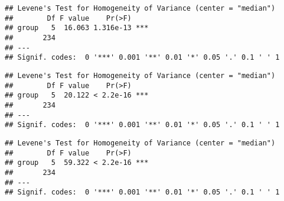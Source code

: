 \documentclass[
]{article}
\newenvironment{Shaded}{\begin{snugshade}}{\end{snugshade}}
\newcommand{\AttributeTok}[1]{\textcolor[rgb]{0.80,0.80,0.80}{#1}}
\newcommand{\FunctionTok}[1]{\textcolor[rgb]{0.94,0.94,0.56}{#1}}
\newcommand{\NormalTok}[1]{\textcolor[rgb]{0.80,0.80,0.80}{#1}}
\newcommand{\SpecialCharTok}[1]{\textcolor[rgb]{0.86,0.64,0.64}{#1}}
\newcommand{\StringTok}[1]{\textcolor[rgb]{0.80,0.58,0.58}{#1}}
\begin{document}
\begin{Shaded}
\end{Shaded}

\begin{verbatim}
## Levene's Test for Homogeneity of Variance (center = "median")
##        Df F value    Pr(>F)    
## group   5  16.063 1.316e-13 ***
##       234                      
## ---
## Signif. codes:  0 '***' 0.001 '**' 0.01 '*' 0.05 '.' 0.1 ' ' 1
\end{verbatim}

\begin{Shaded}
\end{Shaded}

\begin{verbatim}
## Levene's Test for Homogeneity of Variance (center = "median")
##        Df F value    Pr(>F)    
## group   5  20.122 < 2.2e-16 ***
##       234                      
## ---
## Signif. codes:  0 '***' 0.001 '**' 0.01 '*' 0.05 '.' 0.1 ' ' 1
\end{verbatim}

\begin{Shaded}
\end{Shaded}

\begin{verbatim}
## Levene's Test for Homogeneity of Variance (center = "median")
##        Df F value    Pr(>F)    
## group   5  59.322 < 2.2e-16 ***
##       234                      
## ---
## Signif. codes:  0 '***' 0.001 '**' 0.01 '*' 0.05 '.' 0.1 ' ' 1
\end{verbatim}
\end{document}
